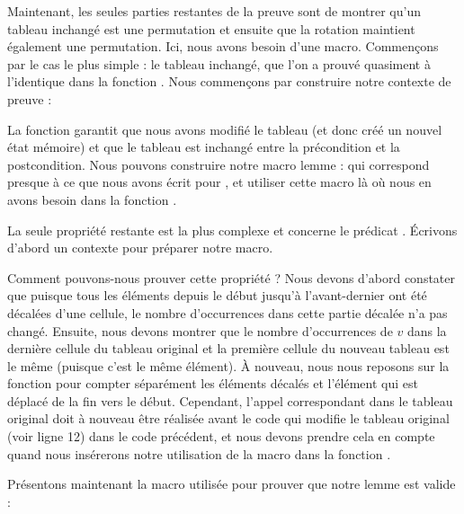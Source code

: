 Maintenant, les seules parties restantes de la preuve sont de montrer qu'un tableau
inchangé est une permutation et ensuite que la rotation maintient également une
permutation. Ici, nous avons besoin d'une macro. Commençons par le cas le plus simple :
le tableau inchangé, que l'on a prouvé quasiment à l'identique dans la fonction
. Nous commençons par construire notre contexte de
preuve :




La fonction  garantit que nous avons
modifié le tableau (et donc créé un nouvel état mémoire) et que le tableau est
inchangé entre la précondition et la postcondition. Nous pouvons construire
notre macro lemme :
qui correspond presque à ce que nous avons écrit pour ,
et utiliser cette macro là où nous en avons besoin dans la fonction
.




La seule propriété restante est la plus complexe et concerne le prédicat
. Écrivons d'abord un contexte pour préparer notre
macro.




Comment pouvons-nous prouver cette propriété ? Nous devons d'abord constater
que puisque tous les éléments depuis le début jusqu'à l'avant-dernier ont été
décalées d'une cellule, le nombre d'occurrences dans cette partie décalée n'a
pas changé. Ensuite, nous devons montrer que le nombre d'occurrences de $v$
dans la dernière cellule du tableau original et la première
cellule du nouveau tableau est le même (puisque c'est le même élément).
À nouveau, nous nous reposons sur la fonction  pour compter
séparément les éléments décalés et l'élément qui est déplacé de la fin vers le
début. Cependant, l'appel correspondant dans le tableau original doit à nouveau
être réalisée avant le code qui modifie le tableau original (voir ligne 12) dans
le code précédent, et nous devons prendre cela en compte quand nous insérerons
notre utilisation de la macro dans la fonction .


Présentons maintenant la macro utilisée pour prouver que notre lemme
est valide :




